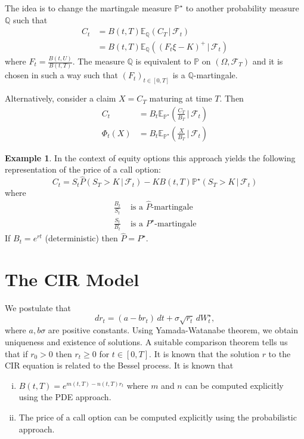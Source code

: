 \documentclass[10pt, oneside, reqno]{amsbook}
\theoremstyle{plain}%
\theoremstyle{definition}
\newtheorem{exmp}[thm]{Example}
\theoremstyle{rem}
\theoremstyle{definition}
\def \P {\ensuremath{\mathcal{P}}}
\newcommand{\given}{ \, | \,}
\newcommand{\sigf}{\mathcal{F}}
\newcommand{\Q}{\mathbb{Q}}
\newcommand{\E}{\mathbb{E}}
\renewcommand{\P}{\mathbb{P}}
\numberwithin{equation}{chapter}
\begin{document}
The idea is to change the martingale measure $\P^\star$ to another probability measure $\Q$ such that \begin{align*}
    C_t &= B(t, T) \E_{\Q} \left(C_T \given \sigf_t \right) \\
    &= B(t, T) \E_{\Q} \left( \left(F_t \xi - K \right)^+ \given \sigf_t \right)
\end{align*} where $F_t = \frac{B(t, U)}{B(t, T)}$.  The measure $\Q$ is equivalent to $\P$ on $(\Omega, \sigf_T)$ and it is chosen in such a way such that $(F_t)_{t \in [0, T]}$ is a $\Q$-martingale.


Alternatively, consider a claim $X = C_T$ maturing at time $T$.  Then \begin{align*}
    C_t &= B_t \E_{\P^\star} \left( \frac{C_T}{B_T} \given \sigf_t \right) \\
    \Phi_t(X) &= B_t \E_{\P^\star} \left( \frac{X}{B_T} \given \sigf_t \right)
\end{align*}
\begin{exmp}
    In the context of equity options this approach yields the following representation of the price of a call option: \[
        C_t = S_t \hat P \left(S_T > K \given \sigf_t \right) - K B(t, T) \P^\star \left( S_T > K \given \sigf_t \right)
    \] 
    where \begin{align*}
        \frac{B_t}{S_t} &\text{ is a $\hat P$-martingale} \\
        \frac{S_t}{B_t} &\text{ is a $P^\star$-martingale}
    \end{align*}  If $B_t = e^{rt}$ (deterministic) then $\hat P =  P^\star$.
\end{exmp}

\section{The CIR Model} %
\label{sub:the_cir}
We postulate that \[
    dr_t = (a- b r_t) \, dt + \sigma \sqrt{r_t} \, dW^\star_t,
\]  where $a, b \sigma$ are positive constants.  Using Yamada-Watanabe theorem, we obtain uniqueness and existence of solutions.  A suitable comparison theorem tells us that if $r_0 > 0$ then $r_t \geq 0$ for $ t \in [ 0, T]$.  It is known that the solution $r$ to the CIR equation is related to the Bessel process.  It is known that \begin{enumerate}[(i)]
    \item $B(t, T) = e^{m(t, T) - n(t, T) r_t}$ where $m$ and $n$ can be computed explicitly using the PDE approach.  
    \item The price of a call option can be computed explicitly using the probabilistic approach.
\end{enumerate} 
\end{document}
